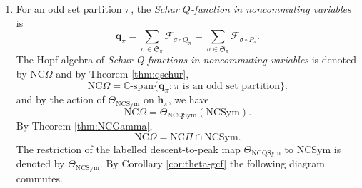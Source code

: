 \documentclass[11pt]{amsart}
\numberwithin{equation}{section}
\newcommand{\NCQSym}{\mathrm{NCQSym}}
\newcommand{\NCSym}{\mathrm{NCSym}}
\newcommand{\NCPeak}{\mathrm{NC}\Pi}
\newcommand{\NCGamma}{\mathrm{NC}\Omega}
\newcommand{\scrY}{{\mathscr{Y}}}
\newcommand{\scrF}{{\mathscr{F}}}
\newcommand{\frakS}{{\mathfrak{S}}}
\newcommand{\bfp}{{\mathbf{p}}}
\newcommand{\bfG}{{\mathbf{G}}}
\begin{document}
\begin{enumerate}[leftmargin=*]
\begin{enumerate}
\item  For $\pi=\pi_1/\pi_2/\cdots/\pi_{\ell(\pi)}\vdash [n]$, by Theorem \ref{thm:NCSym} we have
$$\Theta_\NCSym(\bfp_\pi)=\begin{cases}
2^{\ell(\pi)}\bfp_\pi & \text{if all blocks of $\pi$ have odd sizes,}\\
0 & \text{otherwise.}
\end{cases} $$

\end{enumerate} 


\item For an odd set partition $\pi$, the \emph{Schur $Q$-function in noncommuting variables} is 
$$\mathbf{q}_\pi=\sum_{\sigma\in \frakS_{\pi}} \scrF_{\sigma\circ Q_{\pi}}=\sum_{\sigma\in \frakS_{\pi}} \scrF_{\sigma\circ P_{\pi}}.$$
The Hopf algebra of \emph{Schur Q-functions in noncommuting variables} is denoted by $\NCGamma$ and by Theorem \ref{thm:qschur},
$$\NCGamma=\mathbb{C}\text{-span}\{\mathbf{q}_\pi: \pi \text{~is an odd set partition}\}.$$ 
 and by the action of $\Theta_\NCSym$ on $\mathbf{h}_\pi$, we have $$\NCGamma=\Theta_\NCQSym(\NCSym).$$ %
By Theorem \ref{thm:NCGamma},
$$\NCGamma=\NCPeak\cap \NCSym.$$
The restriction of the labelled descent-to-peak map $\Theta_{\NCQSym}$ to $\NCSym$ is denoted by $\Theta_\NCSym$. By Corollary \ref{cor:theta-gcf} the following diagram commutes.

\begin{center}
\end{center}
\end{enumerate}
\end{document}

